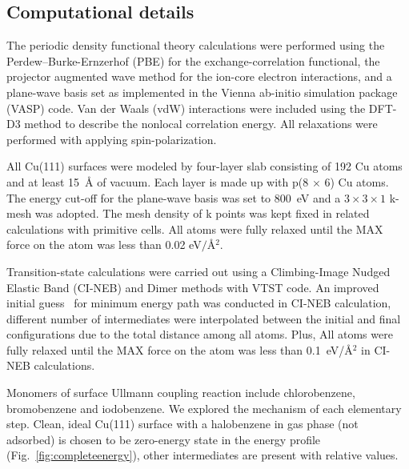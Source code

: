 \documentclass[%
 reprint,
 amsmath,amssymb,
 aps,
prb,
floatfix,
]{revtex4-2}
\newcommand{\comm}{\color{Purple}} %
\begin{document}
\subsection{Computational details}
{\color{blue}
The periodic density functional theory calculations were performed using the Perdew–Burke-Ernzerhof (PBE) for the exchange-correlation functional, the projector augmented wave method for the ion-core electron interactions, and a plane-wave basis set as implemented in the Vienna ab-initio simulation package (VASP) code. Van der Waals (vdW) interactions were included using the DFT-D3 method to describe the nonlocal correlation energy. All relaxations were performed with applying spin-polarization.

All Cu(111) surfaces were
modeled by four-layer slab consisting of 192 Cu atoms and at least \SI{15}{\angstrom} of vacuum. Each layer is made up with p(8 $\times$ 6) Cu atoms. The energy cut-off for the plane-wave basis was set to \SI{800}{\electronvolt} and a $3\times 3 \times1$ k-mesh was adopted. The mesh density of k points was kept fixed in related calculations with primitive cells. All atoms were fully relaxed until the MAX force on the atom was less than 0.02 \si{\electronvolt}$/$\si{\angstrom}$^{2}$. 

Transition-state calculations were carried out using a Climbing-Image Nudged Elastic Band (CI-NEB) and Dimer methods with VTST code\cite{ullmann_59}. An improved initial guess~\cite{ullmann_60, ullmann_99} for minimum energy path was conducted in CI-NEB calculation, different number of intermediates were interpolated between the initial and final configurations due to the total distance among all atoms. Plus, All atoms were fully relaxed until the MAX force on the atom was less than \SI{0.1}{\electronvolt}/\si{\angstrom}$^{2}$ in CI-NEB calculations.



Monomers of surface Ullmann coupling reaction include chlorobenzene, bromobenzene and iodobenzene. We explored the mechanism of each elementary step.
Clean, ideal Cu(111) surface with a halobenzene in gas phase (not adsorbed) is chosen to be zero-energy state in the energy profile (Fig.~\ref{fig:completeenergy}), other intermediates are present with relative values.
}
\end{document}

